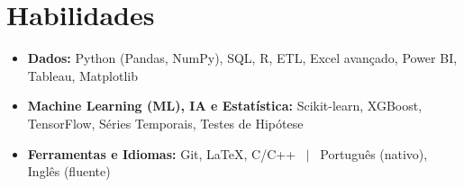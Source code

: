 \section{Habilidades}
\begin{itemize}[leftmargin=0.15in, label={}, itemsep=-3pt, topsep=2pt]
  \item \small{\textbf{Dados:} Python (Pandas, NumPy), SQL, R, ETL, Excel avançado, Power BI, Tableau, Matplotlib}
  \item \small{\textbf{Machine Learning (ML), IA e Estatística:} Scikit-learn, XGBoost, TensorFlow, Séries Temporais, Testes de Hipótese}
  \item \small{\textbf{Ferramentas e Idiomas:} Git, LaTeX, C/C++ \, $|$ \, Português (nativo), Inglês (fluente)}
\end{itemize}
